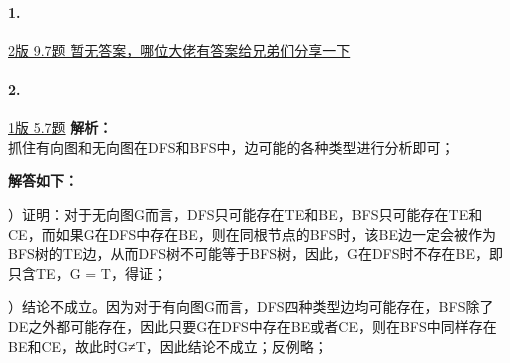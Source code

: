 \documentclass{article}
\begin{document}
\paragraph{1.}
\href{https://github.com/Shannju/njucser_helphelp/blob/main/Algorithm%E7%AE%97%E6%B3%95/%E7%AD%94%E6%A1%88/P4~7.pdf}{2版 9.7题 暂无答案，哪位大佬有答案给兄弟们分享一下}

\paragraph{2.}
\href{https://github.com/Shannju/njucser_helphelp/blob/main/Algorithm%E7%AE%97%E6%B3%95/%E7%AD%94%E6%A1%88/%E7%AE%97%E6%B3%95%E7%AD%94%E6%A1%88csdn%EF%BC%88%E5%8A%A9%E6%95%99%E5%B7%B2%E5%88%A0%E9%99%A4.pdf}{1版 5.7题}
\noindent\textbf{解析：\\}抓住有向图和无向图在DFS和BFS中，边可能的各种类型进行分析即可；

\noindent\textbf{解答如下：}

）证明：对于无向图G而言，DFS只可能存在TE和BE，BFS只可能存在TE和CE，而如果G在DFS中存在BE，则在同根节点的BFS时，该BE边一定会被作为BFS树的TE边，从而DFS树不可能等于BFS树，因此，G在DFS时不存在BE，即只含TE，G = T，得证；

）结论不成立。因为对于有向图G而言，DFS四种类型边均可能存在，BFS除了DE之外都可能存在，因此只要G在DFS中存在BE或者CE，则在BFS中同样存在BE和CE，故此时G≠T，因此结论不成立；反例略；
\end{document}

